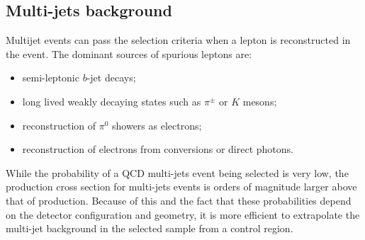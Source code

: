 \subsection{Multi-jets background}
\label{sec:qcdbckg}

Multijet events can pass the selection criteria when a lepton is
reconstructed in the event. The dominant sources of spurious leptons
are:
\begin{itemize}
\item semi-leptonic $b$-jet decays;
\item long lived weakly decaying states such as $\pi^{\pm}$ or $K$
  mesons;
\item reconstruction of $\pi^0$ showers as electrons;
\item reconstruction of electrons from conversions or direct photons.
\end{itemize}

While the probability of a QCD multi-jets event being selected is very
low, the production cross section for multi-jets events is orders of
magnitude larger above that of \ttbar{} production.
Because of this and the fact that these probabilities depend on the
detector configuration and geometry, it is more efficient to
extrapolate the multi-jet background in the selected sample from a
control region.

